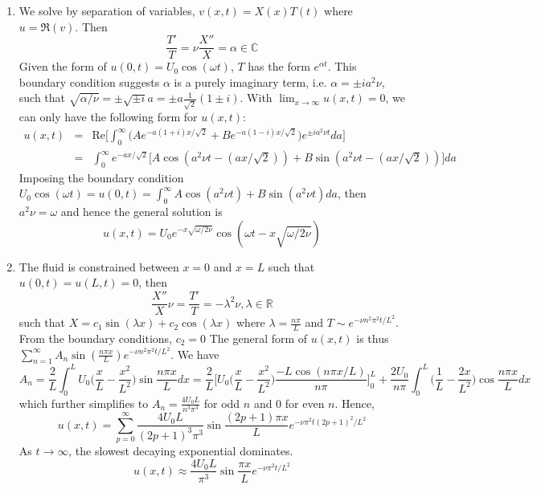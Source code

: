 \documentclass[a4paper]{article}
\begin{document}
\begin{ans}\leavevmode
\begin{enumerate}[label=(\roman*)]
    \item We solve by separation of variables, $v(x,t)=X(x)T(t)$ where $u=\Re(v)$. Then $$\frac{T'}{T}=\nu\frac{X''}{X}=\alpha\in\mathbb{C}$$
Given the form of $u(0,t)=U_0\cos(\omega t)$, $T$ has the form $e^{\alpha t}$. This boundary condition suggests $\alpha$ is a purely imaginary term, i.e. $\alpha=\pm ia^2\nu$, such that $\sqrt{\alpha/\nu}=\pm\sqrt{\pm i}a=\pm a\frac{1}{\sqrt{2}}(1\pm i)$. With $\lim_{x\rightarrow\infty}u(x,t)=0$, we can only have the following form for $u(x,t)$:
\begin{eqnarray}
u(x,t)&=&\text{Re}\bigg[\int_0^\infty\bigg(Ae^{-a(1+i)x/\sqrt{2}}+Be^{-a(1-i)x/\sqrt{2}}\bigg)e^{\pm ia^2\nu t}da\bigg]\nonumber\\&=&\int_0^\infty e^{-ax/\sqrt{2}}\bigg[A\cos(a^2\nu t-(ax/\sqrt{2}))+B\sin(a^2\nu t-(ax/\sqrt{2}))\bigg]da\nonumber
\end{eqnarray}
Imposing the boundary condition $U_0\cos(\omega t)=u(0,t)=\int_0^\infty A\cos(a^2\nu t)+B\sin(a^2\nu t)da$, then $a^2\nu=\omega$ and hence the general solution is
$$u(x,t)=U_0e^{-x\sqrt{\omega/2\nu}}\cos(\omega t-x\sqrt{\omega/2\nu})$$
\item  The fluid is constrained between $x=0$ and $x=L$ such that $u(0,t)=u(L,t)=0$, then
$$\frac{X''}{X}\nu=\frac{T'}{T}=-\lambda^2\nu,\lambda\in\mathbb{R}$$
such that $X=c_1\sin(\lambda x)+c_2\cos(\lambda x)$ where $\lambda=\frac{n\pi}{L}$ and $T\sim e^{-\nu n^2\pi^2t/L^2}$. From the boundary conditions, $c_2=0$  The general form of $u(x,t)$ is thus $\sum_{n=1}^\infty A_n\sin(\frac{n\pi x}{L})e^{-\nu n^2\pi^2t/L^2}$. We have
$$A_n=\frac{2}{L}\int_0^LU_0\bigg(\frac{x}{L}-\frac{x^2}{L^2}\bigg)\sin\frac{n\pi x}{L}dx=\frac{2}{L}\bigg[U_0\bigg(\frac{x}{L}-\frac{x^2}{L^2}\bigg)\frac{-L\cos(n\pi x/L)}{n\pi}\bigg]_0^L+\frac{2U_0}{n\pi}\int_0^L\bigg(\frac{1}{L}-\frac{2x}{L^2}\bigg)\cos\frac{n\pi x}{L}dx$$
which further simplifies to $A_n=\frac{4U_0L}{n^3\pi^3}$ for odd $n$ and 0 for even $n$. Hence,
$$u(x,t)=\sum_{p=0}^\infty\frac{4U_0L}{(2p+1)^3\pi^3}\sin\frac{(2p+1)\pi x}{L}e^{-\nu\pi^2t(2p+1)^2/L^2}$$
As $t\rightarrow\infty$, the slowest decaying exponential dominates.
$$u(x,t)\approx\frac{4U_0L}{\pi^3}\sin\frac{\pi x}{L}e^{-\nu\pi^2t/L^2}$$
\end{enumerate}
\end{ans}
\newpage
\end{document}
